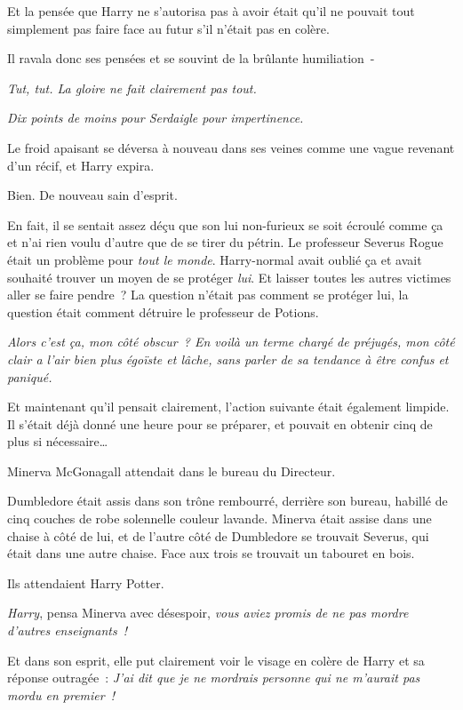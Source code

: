 Et la pensée que Harry ne s'autorisa pas à avoir était qu'il ne pouvait tout simplement pas faire face au futur s'il n'était pas en colère.

Il ravala donc ses pensées et se souvint de la brûlante humiliation~-

\emph{Tut, tut. La gloire ne fait clairement pas tout.}

\emph{Dix points de moins pour Serdaigle pour impertinence.}

Le froid apaisant se déversa à nouveau dans ses veines comme une vague revenant d'un récif, et Harry expira.

Bien. De nouveau sain d'esprit.

En fait, il se sentait assez déçu que son lui non-furieux se soit écroulé comme ça et n'ai rien voulu d'autre que de se tirer du pétrin. Le professeur Severus Rogue était un problème pour \emph{tout le monde}. Harry-normal avait oublié ça et avait souhaité trouver un moyen de se protéger \emph{lui}. Et laisser toutes les autres victimes aller se faire pendre~? La question n'était pas comment se protéger lui, la question était comment détruire le professeur de Potions.

\emph{Alors c'est ça, mon côté obscur~? En voilà un terme chargé de préjugés, mon côté clair a l'air bien plus égoïste et lâche, sans parler de sa tendance à être confus et paniqué.}

Et maintenant qu'il pensait clairement, l'action suivante était également limpide. Il s'était déjà donné une heure pour se préparer, et pouvait en obtenir cinq de plus si nécessaire…

\later

Minerva McGonagall attendait dans le bureau du Directeur.

Dumbledore était assis dans son trône rembourré, derrière son bureau, habillé de cinq couches de robe solennelle couleur lavande. Minerva était assise dans une chaise à côté de lui, et de l'autre côté de Dumbledore se trouvait Severus, qui était dans une autre chaise. Face aux trois se trouvait un tabouret en bois.

Ils attendaient Harry Potter.

\emph{Harry}, pensa Minerva avec désespoir, \emph{vous aviez promis de ne pas mordre d'autres enseignants~!}

Et dans son esprit, elle put clairement voir le visage en colère de Harry et sa réponse outragée~: \emph{J'ai dit que je ne mordrais personne qui ne m'aurait pas mordu en premier~!}

